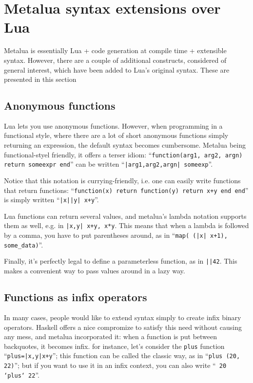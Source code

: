 \section{Metalua syntax extensions over Lua}
Metalua is essentially Lua + code generation at compile time +
extensible syntax. However, there are a couple of additional
constructs, considered of general interest, which have been added to
Lua's original syntax. These are presented in this section

\subsection{Anonymous functions}
Lua lets you use anonymous functions. However, when programming in a
functional style, where there are a lot of short anonymous functions
simply returning an expression, the default syntax becomes
cumbersome. Metalua being functional-styel friendly, it
offers a terser idiom: ``{\tt function(arg1, arg2, argn) return
  someexpr end}'' can be written ``{\tt|arg1,arg2,argn| someexp}''. 

Notice that this notation is currying-friendly, i.e. one can easily
write functions that return functions: ``{\tt function(x) return
function(y) return x+y end end}'' is simply written ``{\tt|x||y|
x+y}''.

Lua functions can return several values, and metalua's lambda notation
supports them as well, e.g. in {\tt |x,y| x+y, x*y}. This means that
when a lambda is followed by a comma, you have to put parentheses
around, as in ``{\tt map( (|x| x+1), some\_data)}''.

Finally, it's perfectly legal to define a parameterless function, as
in {\tt ||42}. This makes a convenient way to pass values around in a
lazy way.

\subsection{Functions as infix operators}

In many cases, people would like to extend syntax simply to create
infix binary operators. Haskell offers a nice compromize to satisfy
this need without causing any mess, and metalua incorporated it: when
a function is put between backquotes, it becomes infix. for instance,
let's consider the {\tt plus} function ``{\tt plus=|x,y|x+y}''; this
function can be called the classic way, as in ``{\tt plus (20, 22)}''; but
if you want to use it in an infix context, you can also write ``{\tt
20 `plus` 22}''.

